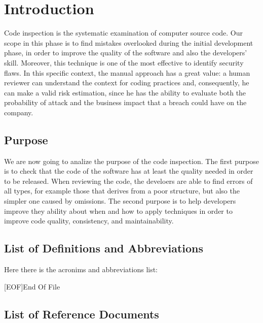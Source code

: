 \section{Introduction} \label{sec:intro}

Code inspection is the systematic examination of computer source code. Our scope in this phase is to find mistakes overlooked during the initial development phase, in order to improve the quality of the software and also the developers' skill.\newline
Moreover, this technique is one of the most effective to identify security flaws. 
In this specific context, the manual approach has a great value: a human reviewer can understand the context for coding practices and, consequently, he can make a valid risk estimation, since he has the ability to evaluate both the probability of attack and the business impact that a breach could have on the company.

\subsection{Purpose}

We are now going to analize the purpose of the code inspection. \newline
The first purpose is to check that the code of the software has at least the quality needed in order to be released. When reviewing the code, the develoers are able to find errors of all types, for example those that derives from a poor structure, but also the simpler one caused by omissions. \newline
The second purpose is to help developers improve they ability about when and how to apply techniques in order to improve code quality, consistency, and maintainability.

\subsection{List of Definitions and Abbreviations}
Here there is the acronims and abbreviations list:


\begin{acronym}[EOF] %

[EOF]{End Of File}

\end{acronym}

\subsection{List of Reference Documents}


